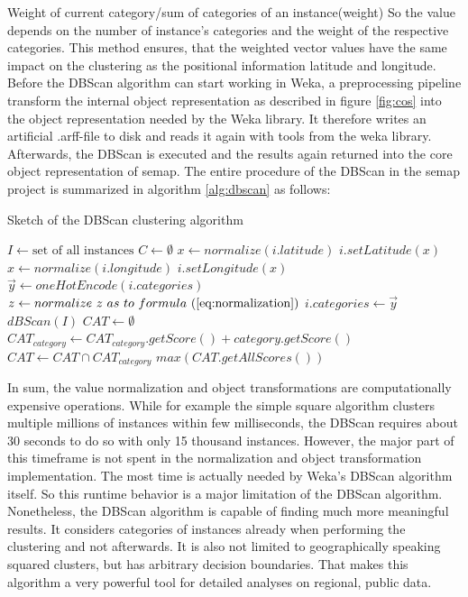 Weight of current category/sum of categories of an instance(weight)
So the value depends on the number of instance’s categories and the weight of the respective categories. This method ensures, that the weighted vector values have the same impact on the clustering as the positional information latitude and longitude. Before the DBScan algorithm can start working in Weka, a preprocessing pipeline transform the internal object representation as described in figure \ref{fig:cos} into the object representation needed by the Weka library. It therefore writes an artificial .arff-file to disk and reads it again with tools from the weka library. Afterwards, the DBScan is executed and the results again returned into the core object representation of semap. The entire procedure of the DBScan in the semap project is summarized in algorithm \ref{alg:dbscan} as follows:

\begin{algorithm}
\caption{Sketch of the DBScan clustering algorithm}\label{alg:dbscan}
\begin{algorithmic} 
\STATE $I \gets \text{set~of~all~instances}$
\STATE $C \gets \emptyset$
\STATE $x \gets normalize(i.latitude)$
\STATE $i.setLatitude(x)$
\STATE $x \gets normalize(i.longitude)$
\STATE $i.setLongitude(x)$
\STATE $\vec{y} \gets oneHotEncode(i.categories)$
\STATE $z \gets normalize~z~as~to~formula~(\ref{eq:normalization})$
\ENDFOR
\STATE $i.categories \gets \vec{y}$
\ENDFOR
\STATE $dBScan(I)$
\STATE ${CAT} \gets \emptyset$
\STATE ${CAT}_{category} \gets {CAT}_{category}.getScore() + category.getScore()$
\STATE ${CAT} \gets {CAT} \cap {CAT}_{category}$
\ENDFOR
\ENDFOR
\RETURN $max({CAT}.getAllScores())$
\end{algorithmic}
\end{algorithm}

In sum, the value normalization and object transformations are computationally expensive operations. While for example the simple square algorithm clusters multiple millions of instances within few milliseconds, the DBScan requires about 30 seconds to do so with only 15 thousand instances. However, the major part of this timeframe is not spent in the normalization and object transformation implementation. The most time is actually needed by Weka’s DBScan algorithm itself. So this runtime behavior is a major limitation of the DBScan algorithm. Nonetheless, the DBScan algorithm is capable of finding much more meaningful results. It considers categories of instances already when performing the clustering and not afterwards. It is also not limited to geographically speaking squared clusters, but has arbitrary decision boundaries. That makes this algorithm a very powerful tool for detailed analyses on regional, public data.

